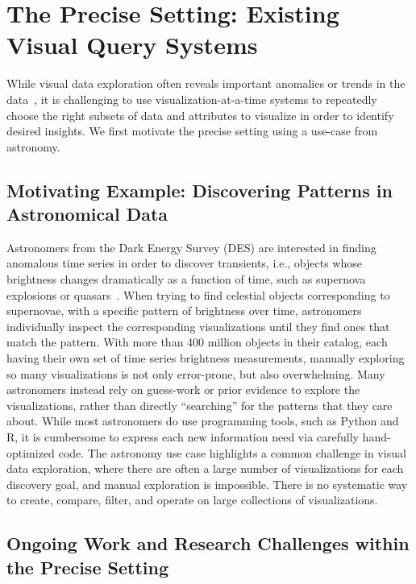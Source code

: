 
\section{The Precise Setting: Existing Visual Query Systems}\label{sec:precise}
While visual data exploration often reveals 
important anomalies or trends 
in the data~\cite{Heer2012,Morton2014}, 
it is challenging to 
use visualization-at-a-time systems to 
repeatedly choose the right subsets of 
data and attributes to visualize
in order to identify desired insights.
We first motivate
the precise setting using a use-case from
astronomy.

\subsection{Motivating Example: Discovering Patterns in Astronomical Data}
Astronomers from the Dark Energy Survey (DES) 
are interested in finding 
anomalous time series 
in order to discover 
transients, 
i.e., objects whose brightness 
changes dramatically as a function of time, 
such as supernova explosions or quasars~\cite{Drlica-Wagner2017}. 
When trying to find celestial objects 
corresponding to supernovae, 
with a specific pattern of brightness over time, 
astronomers individually inspect the corresponding 
visualizations until 
they find ones that match the pattern. 
With more than 400 million objects in their catalog, 
each having their own set of time series brightness measurements, 
manually exploring so many 
visualizations is not only error-prone, 
but also overwhelming.
Many astronomers instead rely on guess-work 
or prior evidence to explore the visualizations,
rather than directly ``searching'' for the patterns
that they care about. 
While most astronomers do use 
programming tools, such as Python and R,
it is cumbersome to express each new information need
via carefully hand-optimized code. 
The astronomy use case highlights a 
common challenge in visual data exploration,
where there are often a large number of visualizations
for each discovery goal,
and manual exploration is impossible.
There is no systematic way to create, compare, filter,
and operate on large collections of visualizations.

\subsection{Ongoing Work and Research Challenges within the Precise Setting}

